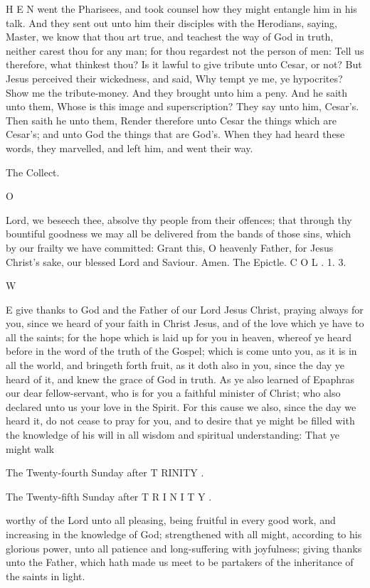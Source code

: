 H E N went the Pharisees, and took counsel how they might entangle him in his talk. And they sent out unto him their disciples with the Herodians, saying, Master, we know that thou art true, and teachest the way of God in truth, neither carest thou for any man; for thou regardest not the person of men: Tell us therefore, what thinkest thou? Is it lawful to give tribute unto Cesar, or not? But Jesus perceived their wickedness, and said, Why tempt ye me, ye hypocrites? Show me the tribute-money. And they brought unto him a peny. And he saith unto them, Whose is this image and superscription? They say unto him, Cesar’s. Then saith he unto them, Render therefore unto Cesar the things which are Cesar’s; and unto God the things that are God's. When they had heard these words, they marvelled, and left him, and went their way.

The Collect.

O

Lord, we beseech thee, absolve thy people from their offences; that through thy bountiful goodness we may all be delivered from the bands of those sins, which by our frailty we have committed: Grant this, O heavenly Father, for Jesus Christ’s sake, our blessed Lord and Saviour. Amen. The Epictle. C O L . 1. 3.

W

E give thanks to God and the Father of our Lord Jesus Christ, praying always for you, since we heard of your faith in Christ Jesus, and of the love which ye have to all the saints; for the hope which is laid up for you in heaven, whereof ye heard before in the word of the truth of the Gospel; which is come unto you, as it is in all the world, and bringeth forth fruit, as it doth also in you, since the day ye heard of it, and knew the grace of God in truth. As ye also learned of Epaphras our dear fellow-servant, who is for you a faithful minister of Christ; who also declared unto us your love in the Spirit. For this cause we also, since the day we heard it, do not cease to pray for you, and to desire that ye might be filled with the knowledge of his will in all wisdom and spiritual understanding: That ye might walk

The Twenty-fourth Sunday after T RINITY .

The Twenty-fifth Sunday after T R I N I T Y .

worthy of the Lord unto all pleasing, being fruitful in every good work, and increasing in the knowledge of God; strengthened with all might, according to his glorious power, unto all patience and long-suffering with joyfulness; giving thanks unto the Father, which hath made us meet to be partakers of the inheritance of the saints in light.

